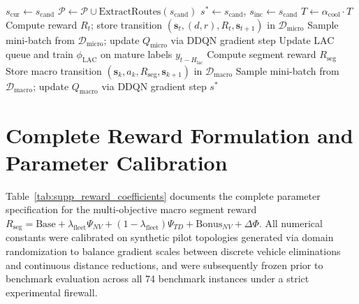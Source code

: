 \documentclass{article}
\begin{document}
\begin{algorithm}[!htbp]
\begin{algorithmic}[1]
        \State $s_{\text{cur}} \leftarrow s_{\text{cand}}$
            \State $\mathcal{P} \leftarrow \mathcal{P} \cup \text{ExtractRoutes}(s_{\text{cand}})$
                \State $s^* \leftarrow s_{\text{cand}}$, $s_{\text{inc}} \leftarrow s_{\text{cand}}$
            \EndIf
        \EndIf
    \EndIf
    \State $T \leftarrow \alpha_{\text{cool}} \cdot T$ 
    \State Compute reward $R_t$; store transition $(\mathbf{s}_t, (d,r), R_t, \mathbf{s}_{t+1})$ in $\mathcal{D}_{\text{micro}}$
    \State Sample mini-batch from $\mathcal{D}_{\text{micro}}$; update $Q_{\text{micro}}$ via DDQN gradient step
    \State Update LAC queue and train $\phi_{\text{LAC}}$ on mature labels $y_{t-H_{\text{lac}}}$
        \State Compute segment reward $R_{\text{seg}}$
        \State Store macro transition $(\mathbf{s}_k, a_k, R_{\text{seg}}, \mathbf{s}_{k+1})$ in $\mathcal{D}_{\text{macro}}$
        \State Sample mini-batch from $\mathcal{D}_{\text{macro}}$; update $Q_{\text{macro}}$ via DDQN gradient step
    \EndIf
\EndFor
\Return $s^*$
\end{algorithmic}
\end{algorithm}

\section{Complete Reward Formulation and Parameter Calibration}
\label{sec:supp_reward_parameters}

Table~\ref{tab:supp_reward_coefficients} documents the complete parameter specification for the multi-objective macro segment reward $R_{\text{seg}} = \text{Base} + \lambda_{\text{fleet}} \Psi_{NV} + (1 - \lambda_{\text{fleet}}) \Psi_{TD} + \text{Bonus}_{NV} + \Delta \Phi$. All numerical constants were calibrated on synthetic pilot topologies generated via domain randomization to balance gradient scales between discrete vehicle eliminations and continuous distance reductions, and were subsequently frozen prior to benchmark evaluation across all 74 benchmark instances under a strict experimental firewall.
\end{document}
